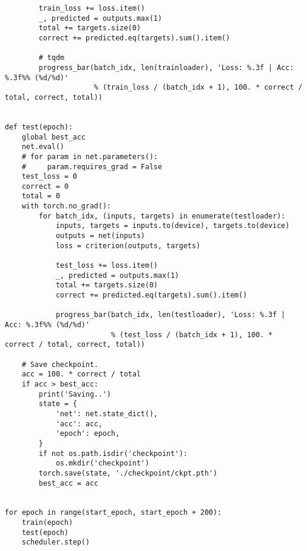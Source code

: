 \documentclass{article}
\begin{document}
\begin{lstlisting}
        train_loss += loss.item()
        _, predicted = outputs.max(1)
        total += targets.size(0)
        correct += predicted.eq(targets).sum().item()

        # tqdm
        progress_bar(batch_idx, len(trainloader), 'Loss: %.3f | Acc: %.3f%% (%d/%d)'
                     % (train_loss / (batch_idx + 1), 100. * correct / total, correct, total))


def test(epoch):
    global best_acc
    net.eval()
    # for param in net.parameters():
    #     param.requires_grad = False
    test_loss = 0
    correct = 0
    total = 0
    with torch.no_grad():
        for batch_idx, (inputs, targets) in enumerate(testloader):
            inputs, targets = inputs.to(device), targets.to(device)
            outputs = net(inputs)
            loss = criterion(outputs, targets)

            test_loss += loss.item()
            _, predicted = outputs.max(1)
            total += targets.size(0)
            correct += predicted.eq(targets).sum().item()

            progress_bar(batch_idx, len(testloader), 'Loss: %.3f | Acc: %.3f%% (%d/%d)'
                         % (test_loss / (batch_idx + 1), 100. * correct / total, correct, total))

    # Save checkpoint.
    acc = 100. * correct / total
    if acc > best_acc:
        print('Saving..')
        state = {
            'net': net.state_dict(),
            'acc': acc,
            'epoch': epoch,
        }
        if not os.path.isdir('checkpoint'):
            os.mkdir('checkpoint')
        torch.save(state, './checkpoint/ckpt.pth')
        best_acc = acc


for epoch in range(start_epoch, start_epoch + 200):
    train(epoch)
    test(epoch)
    scheduler.step()
    \end{lstlisting}
\end{document}
